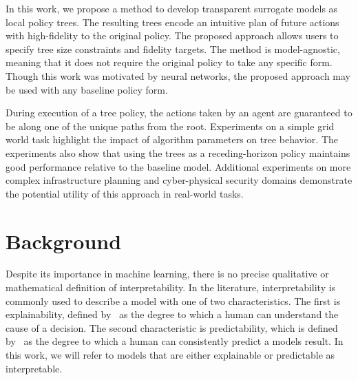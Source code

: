\documentclass[letterpaper]{article} %
\begin{document}
In this work, we propose a method to develop transparent surrogate models as local policy trees. 
The resulting trees encode an intuitive plan of future actions with high-fidelity to the original policy. 
The proposed approach allows users to specify tree size constraints and fidelity targets.
The method is model-agnostic, meaning that it does not require the original policy to take any specific form.
Though this work was motivated by neural networks, the proposed approach may be used 
with any baseline policy form. 

During execution of a tree policy, the actions taken by an agent are guaranteed to be along one of the unique paths from the root. 
Experiments on a simple grid world task highlight the impact of algorithm parameters on tree behavior. 
The experiments also show that using the trees as a receding-horizon policy maintains good performance relative to the baseline model.
Additional experiments on more complex infrastructure planning and cyber-physical security domains demonstrate the potential utility of this approach in real-world tasks. 
\section{Background}
Despite its importance in machine learning, there is no precise qualitative or mathematical definition of interpretability. 
In the literature, interpretability is commonly used to describe a model with one of two characteristics. 
The first is explainability, defined by~\citet{miller2019} as the degree to which a human can understand the cause of a decision.
The second characteristic is predictability, which is defined by~\citet{kim2016} as the degree to which a human can consistently predict a models result.
In this work, we will refer to models that are either explainable or predictable as interpretable. 
\end{document}
